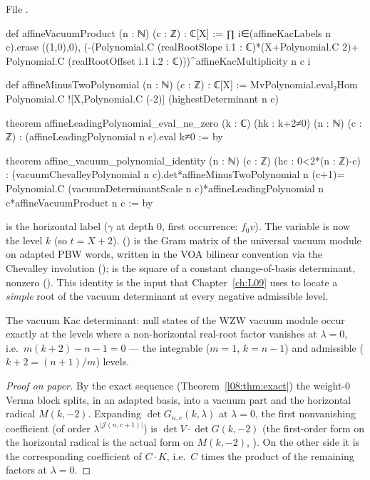 \noindent File .
\begin{leancode}
def affineVacuumProduct (n : ℕ) (c : ℤ) : ℂ[X] :=
  ∏ i∈(affineKacLabels n c).erase ((1,0),0),
    (-(Polynomial.C (realRootSlope i.1 : ℂ)*(X+Polynomial.C 2)+
      Polynomial.C (realRootOffset i.1 i.2 : ℂ)))^affineKacMultiplicity n c i

def affineMinusTwoPolynomial (n : ℕ) (c : ℤ) : ℂ[X] :=
  MvPolynomial.eval₂Hom Polynomial.C ![X,Polynomial.C (-2)] (highestDeterminant n c)

theorem affineLeadingPolynomial_eval_ne_zero (k : ℂ) (hk : k+2≠0) (n : ℕ) (c : ℤ) :
    (affineLeadingPolynomial n c).eval k≠0 := by

theorem affine_vacuum_polynomial_identity (n : ℕ) (c : ℤ)
    (hc : 0<2*(n : ℤ)-c) :
    (vacuumChevalleyPolynomial n c).det*affineMinusTwoPolynomial n (c+1)=
      Polynomial.C (vacuumDeterminantScale n c)*affineLeadingPolynomial n c*affineVacuumProduct n c := by
\end{leancode}

\begin{dictionary}
 is the horizontal label ($\gamma$ at depth $0$, first occurrence: $f_0v$). The variable 
is now the level $k$ (so $t = X+2$).  ()
is the Gram matrix of the universal vacuum module on adapted PBW words, written in the VOA bilinear
convention via the Chevalley involution (); 
is the square of a constant change-of-basis determinant, nonzero (\allowbreak{}\allowbreak{}).
This identity is the input that Chapter~\ref{ch:L09} uses to locate a \emph{simple} root of the vacuum
determinant at every negative admissible level.
\end{dictionary}

\begin{physics}
The vacuum Kac determinant: null states of the WZW vacuum module occur exactly at the levels where a
non-horizontal real-root factor vanishes at $\lambda=0$, i.e.\ $m(k+2) - n - 1 = 0$ --- the integrable
($m=1$, $k = n-1$) and admissible ($k+2 = (n+1)/m$) levels.
\end{physics}

\begin{proof}[Proof on paper]
By the exact sequence (Theorem~\ref{l08:thm:exact}) the weight-0 Verma block splits, in an adapted basis,
into a vacuum part and the horizontal radical $M(k,-2)$. Expanding $\det G_{n,c}(k,\lambda)$ at $\lambda=0$, the
first nonvanishing coefficient (of order $\lambda^{|\mathcal J(n,c+1)|}$) is $\det V\cdot\det G(k,-2)$ (the
first-order form on the horizontal radical is the actual form on $M(k,-2)$,
). On the other side it is the corresponding coefficient of
$C\cdot K$, i.e.\ $C$ times the product of the remaining factors at $\lambda=0$.
\end{proof}

